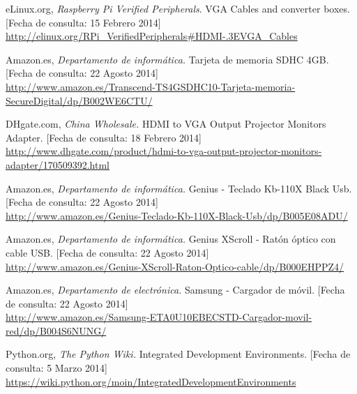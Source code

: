 
\begin{thebibliography}{99}

  eLinux.org,
  \emph{Raspberry Pi Verified Peripherals}. VGA Cables and converter boxes.  [Fecha de consulta: 15 Febrero 2014] \\
  \url{http://elinux.org/RPi_VerifiedPeripherals#HDMI-.3EVGA_Cables}

	Amazon.es,
	\emph{Departamento de informática.}
	 Tarjeta de memoria SDHC 4GB. [Fecha de consulta: 22 Agosto 2014] \\
	\url{http://www.amazon.es/Transcend-TS4GSDHC10-Tarjeta-memoria-SecureDigital/dp/B002WE6CTU/}
	  
	DHgate.com,
	\emph{China Wholesale.}
	HDMI to VGA Output Projector Monitors Adapter. [Fecha de consulta: 18 Febrero 2014] \\
	\url{http://www.dhgate.com/product/hdmi-to-vga-output-projector-monitors-adapter/170509392.html}
	
	Amazon.es,
	\emph{Departamento de informática.}
	Genius - Teclado Kb-110X Black Usb. [Fecha de consulta: 22 Agosto 2014] \\
	\url{http://www.amazon.es/Genius-Teclado-Kb-110X-Black-Usb/dp/B005E08ADU/}
	
	Amazon.es,
	\emph{Departamento de informática.}
	Genius XScroll - Ratón óptico con cable USB. [Fecha de consulta: 22 Agosto 2014] \\
	\url{http://www.amazon.es/Genius-XScroll-Raton-Optico-cable/dp/B000EHPPZ4/}
	
	Amazon.es,
	\emph{Departamento de electrónica.}
	Samsung - Cargador de móvil. [Fecha de consulta: 22 Agosto 2014] \\
	\url{http://www.amazon.es/Samsung-ETA0U10EBECSTD-Cargador-movil-red/dp/B004S6NUNG/}

	Python.org,
	\emph{The Python Wiki.}
	Integrated Development Environments. [Fecha de consulta: 5 Marzo 2014] \\
	\url{https://wiki.python.org/moin/IntegratedDevelopmentEnvironments}
		

\end{thebibliography}
